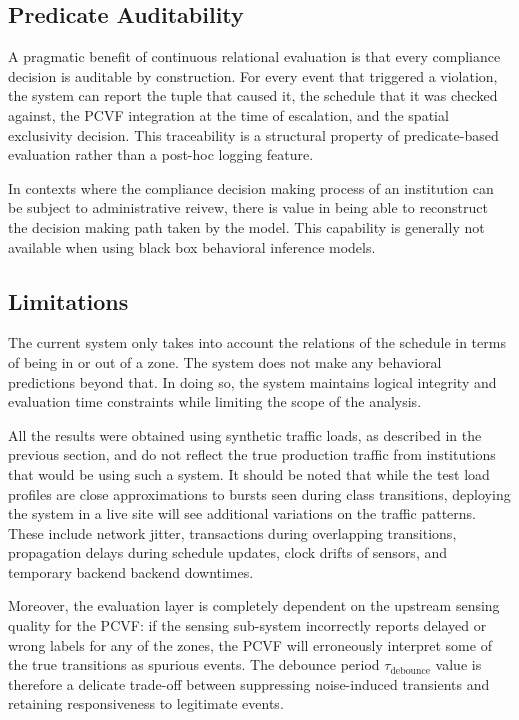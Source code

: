 \documentclass[conference]{IEEEtran}
\begin{document}
\subsection{Predicate Auditability}
A pragmatic benefit of continuous relational evaluation is that every compliance decision is auditable by construction. For every event that triggered a violation, the system can report the tuple that caused it, the schedule that it was checked against, the PCVF integration at the time of escalation, and the spatial exclusivity decision. This traceability is a structural property of predicate-based evaluation rather than a post-hoc logging feature.

In contexts where the compliance decision making process of an institution can be subject to administrative reivew, there is value in being able to reconstruct the decision making path taken by the model. This capability is generally not available when using black box behavioral inference models.

\subsection{Limitations}
The current system only takes into account the relations of the schedule in terms of being in or out of a zone. The system does not make any behavioral predictions beyond that. In doing so, the system maintains logical integrity and evaluation time constraints while limiting the scope of the analysis.

All the results were obtained using synthetic traffic loads, as described in the previous section, and do not reflect the true production traffic from institutions that would be using such a system. It should be noted that while the test load profiles are close approximations to bursts seen during class transitions, deploying the system in a live site will see additional variations on the traffic patterns. These include network jitter, transactions during overlapping transitions, propagation delays during schedule updates, clock drifts of sensors, and temporary backend backend downtimes.

Moreover, the evaluation layer is completely dependent on the upstream sensing quality for the PCVF: if the sensing sub-system incorrectly reports delayed or wrong labels for any of the zones, the PCVF will erroneously interpret some of the true transitions as spurious events. The debounce period $\tau_{\text{debounce}}$ value is therefore a delicate trade-off between suppressing noise-induced transients and retaining responsiveness to legitimate events.
\end{document}

